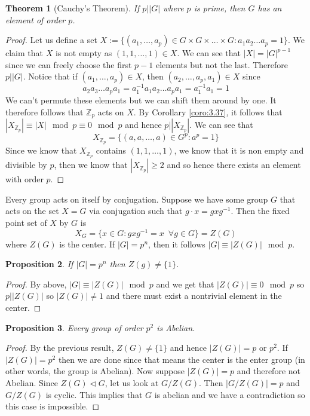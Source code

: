 \documentclass{article}
\newcommand{\Z}{\mathbb{Z}}
\newtheorem{theorem}{Theorem}[section]
\newtheorem{proposition}[theorem]{Proposition}
\theoremstyle{definition}
\begin{document}
\begin{theorem}[Cauchy's Theorem]
    If $p\big||G|$ where $p$ is prime, then $G$ has an element of order $p$.
\end{theorem}
\begin{proof}
    Let us define a set $X:= \{ (a_1,\ldots, a_p) \in G\times G\times\ldots\times G: a_1a_2\ldots a_p =1\}$. We claim that $X$ is not empty as $(1,1,\ldots,1)\in X$. We can see that $|X| = |G|^{p-1}$ since we can freely choose the first $p-1$ elements but not the last. Therefore $p\big| |G|$. Notice that if $(a_1,\ldots, a_p) \in X$, then $(a_2,\ldots,a_p,a_1)\in X$ since 
\begin{equation*}
    a_2a_3\ldots a_pa_1 =a_1^{-1}a_1a_2\ldots a_p a_1 =a_1^{-1}a_1=1
\end{equation*}
We can't permute these elements but we can shift them around by one. It therefore follows that $\Z_p$ acts on $X$. By Corollary \ref{coro:3.37}, it follows that $|X_{\Z_p}|\equiv |X|\mod p \equiv 0 \mod p$ and hence $p\big||X_{\Z_p}|$. We can see that 
\begin{equation*}
    X_{\Z_p} = \{ (a,a,\ldots,a) \in G^p : a^p=1\}
\end{equation*}
Since we know that $X_{\Z_p}$ contains $(1,1,\ldots,1)$, we know that it is non empty and divisible by $p$, then we know that $|X_{\Z_p}|\geq 2$ and so hence there exists an element with order $p$.
\end{proof}
Every group acts on itself by conjugation. Suppose we have some group $G$ that acts on the set $X=G$ via conjugation such that $g\cdot x=gxg^{-1}$. Then the fixed point set of $X$ by $G$ is 
\begin{equation*}
    X_G = \{ x\in G: gxg^{-1}=x \,\,\, \forall g\in G\} = Z(G)
\end{equation*}
where $Z(G)$ is the center. If $|G|=p^n$, then it follows $|G|\equiv |Z(G)|\mod p$. 
\begin{proposition}
    If $|G|=p^n$ then $Z(g) \neq \{1\}$. \label{prop:Z(G) nontrivial for p-groups}
\end{proposition}
\begin{proof}
    By above, $|G|\equiv |Z(G)| \mod p$ and we get that $|Z(G)|\equiv 0\mod p$ so $p\big| |Z(G)|$ so $|Z(G)|\neq 1$ and there must exist a nontrivial element in the center.
\end{proof}
\begin{proposition}
    Every group of order $p^2$ is Abelian.
\end{proposition}
\begin{proof}
    By the previous result, $Z(G) \neq \{1\}$ and hence $|Z(G)|=p$ or $p^2$. If $|Z(G)|=p^2$ then we are done since that means the center is the enter group (in other words, the group is Abelian). Now suppose $|Z(G)|=p$ and therefore not Abelian. Since $Z(G) \lhd G$, let us look at $G/Z(G)$. Then $|G/Z(G)|=p$ and $G/Z(G)$ is cyclic. This implies that $G$ is abelian and we have a contradiction so this case is impossible.
\end{proof}
\end{document}
